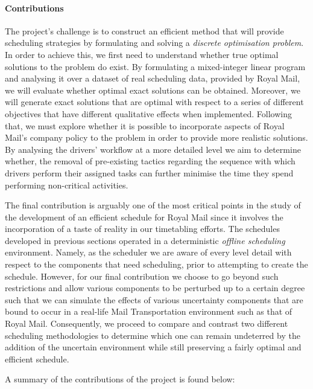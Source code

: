 \vspace{\baselineskip}
\paragraph{Contributions}
The project’s challenge is to construct an efficient method that will provide scheduling strategies by formulating and solving a \textit{discrete optimisation problem}. In order to achieve this, we first need to understand whether true optimal solutions to the problem do exist. By formulating a mixed-integer linear program and analysing it over a dataset of real scheduling data, provided by Royal Mail, we will evaluate whether optimal exact solutions can be obtained. Moreover, we will generate exact solutions that are optimal with respect to a series of different objectives that have different qualitative effects when implemented. Following that, we must explore whether it is possible to incorporate aspects of Royal Mail’s company policy to the problem in order to provide more realistic solutions. By analysing the drivers’ workflow at a more detailed level we aim to determine whether, the removal of pre-existing tactics regarding the sequence with which drivers perform their assigned tasks can further minimise the time they spend performing non-critical activities. 

\vspace{\baselineskip}
\noindent
The final contribution is arguably one of the most critical points in the study of the development of an efficient schedule for Royal Mail since it involves the incorporation of a taste of reality in our timetabling efforts. The schedules developed in previous sections operated in a deterministic \textit{offline scheduling} environment. Namely, as the scheduler we are aware of every level detail with respect to the components that need scheduling, prior to attempting to create the schedule. However, for our final contribution we choose to go beyond such restrictions and allow various components to be perturbed up to a certain degree such that we can simulate the effects of various uncertainty components that are bound to occur in a real-life Mail Transportation environment such as that of Royal Mail. Consequently, we proceed to compare and contrast two different scheduling methodologies to determine which one can remain undeterred by the addition of the uncertain environment while still preserving a fairly optimal and efficient schedule.

\vspace{\baselineskip}
\noindent
A summary of the contributions of the project is found below:


